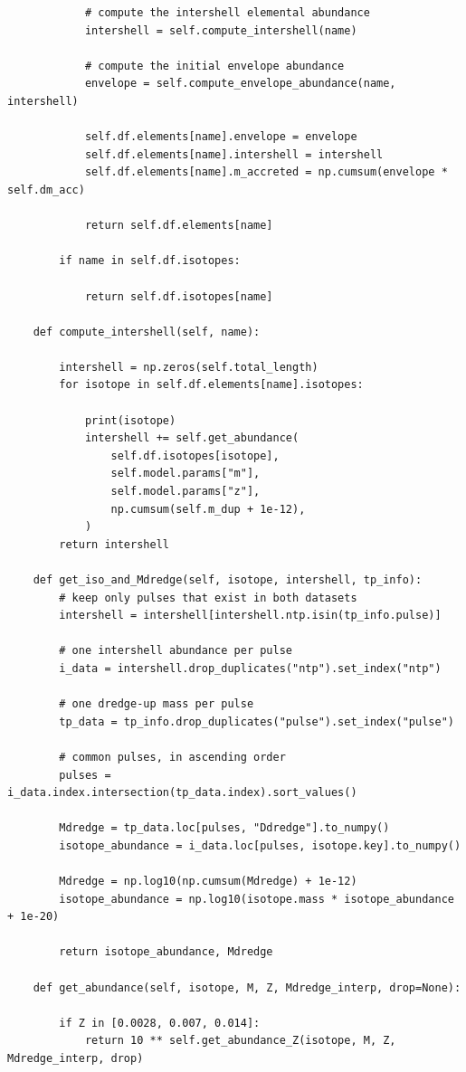 \documentclass[a4paper,10pt]{article}
\begin{document}
\begin{verbatim}
            # compute the intershell elemental abundance
            intershell = self.compute_intershell(name)

            # compute the initial envelope abundance
            envelope = self.compute_envelope_abundance(name, intershell)

            self.df.elements[name].envelope = envelope
            self.df.elements[name].intershell = intershell
            self.df.elements[name].m_accreted = np.cumsum(envelope * self.dm_acc)

            return self.df.elements[name]

        if name in self.df.isotopes:

            return self.df.isotopes[name]

    def compute_intershell(self, name):

        intershell = np.zeros(self.total_length)
        for isotope in self.df.elements[name].isotopes:

            print(isotope)
            intershell += self.get_abundance(
                self.df.isotopes[isotope],
                self.model.params["m"],
                self.model.params["z"],
                np.cumsum(self.m_dup + 1e-12),
            )
        return intershell

    def get_iso_and_Mdredge(self, isotope, intershell, tp_info):
        # keep only pulses that exist in both datasets
        intershell = intershell[intershell.ntp.isin(tp_info.pulse)]

        # one intershell abundance per pulse
        i_data = intershell.drop_duplicates("ntp").set_index("ntp")

        # one dredge-up mass per pulse
        tp_data = tp_info.drop_duplicates("pulse").set_index("pulse")

        # common pulses, in ascending order
        pulses = i_data.index.intersection(tp_data.index).sort_values()

        Mdredge = tp_data.loc[pulses, "Ddredge"].to_numpy()
        isotope_abundance = i_data.loc[pulses, isotope.key].to_numpy()

        Mdredge = np.log10(np.cumsum(Mdredge) + 1e-12)
        isotope_abundance = np.log10(isotope.mass * isotope_abundance + 1e-20)

        return isotope_abundance, Mdredge

    def get_abundance(self, isotope, M, Z, Mdredge_interp, drop=None):

        if Z in [0.0028, 0.007, 0.014]:
            return 10 ** self.get_abundance_Z(isotope, M, Z, Mdredge_interp, drop)


\end{verbatim}
\end{document}

